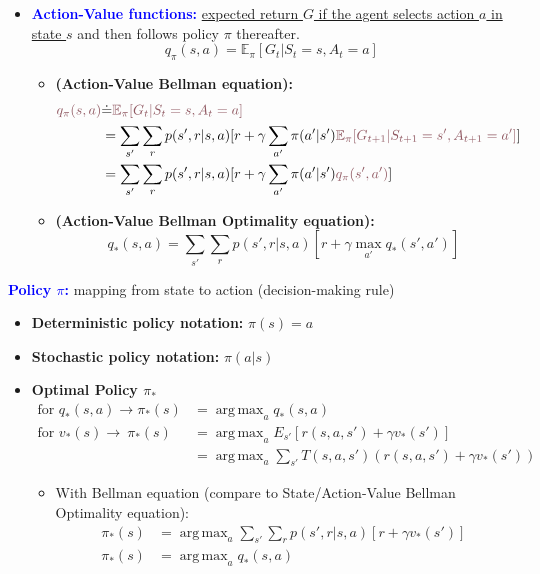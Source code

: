 \documentclass[12pt, a4paper]{article}
\DeclareMathOperator*{\argmax}{arg\,max} %
\begin{document}
\begin{itemize}
  \item
  \textcolor{blue}{\textbf{Action-Value functions:}} \uline{expected return $G$ if the agent selects action $a$ in state $s$} and then follows policy $\pi$ thereafter.
    $$
    q_\pi(s,a) = \mathbb{E}_\pi[G_t | S_t=s, A_t = a]
    $$
    \begin{itemize}
      \item \textbf{(Action-Value Bellman equation):}
        \begin{align*}
        \textcolor[HTML]{8F5760}{q_\pi(s, a)} &\dot{=} \textcolor[HTML]{8F5760}{\mathbb{E}_\pi[G_t | S_t=s, A_t = a]} \\
        &= \sum_{s'} \sum_{r} p(s',r|s,a) [r + \gamma \sum_{a'} \pi(a'|s') \textcolor[HTML]{8F5760}{\mathbb{E}_\pi[G_{t+1} | S_{t+1}=s', A_{t+1} = a']}] \\
        &= \sum_{s'} \sum_{r} p(s',r|s,a) [r + \gamma \sum_{a'} \pi(a'|s') \textcolor[HTML]{8F5760}{q_\pi(s', a')}]
        \end{align*}

        \item \textbf{(Action-Value Bellman Optimality equation):}
          $$
          q_*(s, a) = \sum_{s'} \sum_{r} p(s',r|s,a) [r + \gamma \max_{a'} q_*(s', a')]
          $$
    \end{itemize}
\end{itemize}





\textcolor{blue}{\textbf{Policy \(\pi\):}} mapping from state to action (decision-making rule)

\begin{itemize}
  \item \textbf{Deterministic policy notation:} $\pi(s)=a$
  \item \textbf{Stochastic policy notation:} $\pi(a|s)$
  \item \textbf{Optimal Policy \(\pi_*\)}
  \begin{align*}
    \text{for } q_*(s,a) \rightarrow \pi_*(s) &= \argmax_a q_*(s,a) \\
    \text{for } v_*(s) \rightarrow\ \pi_*(s) &= \argmax_a E_{s'}[r(s,a,s') + \gamma v_*(s')] \\
    &=  \argmax_a \sum_{s'} T(s,a,s') (r(s,a,s') + \gamma v_*(s'))
  \end{align*}

  \begin{itemize}
    \item With Bellman equation (compare to State/Action-Value Bellman Optimality equation):
    \begin{align*}
    \pi_*(s) &= \argmax_a \sum_{s'} \sum_{r} p(s',r|s,a) [r + \gamma v_*(s')] \\
    \pi_*(s) &= \argmax_a q_*(s,a)
    \end{align*}
  \end{itemize}
\end{itemize}
\end{document}
